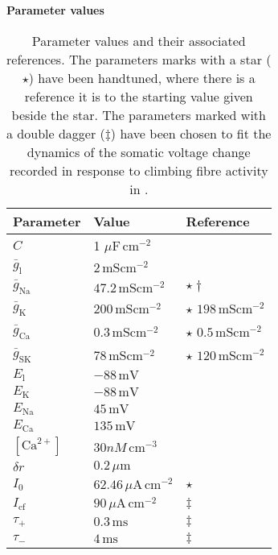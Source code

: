 \documentclass[utf8]{frontiersSCNS} %
\newcommand{\mv}{\,\mathrm{mV}}
\newcommand{\msi}{\,\mathrm{mS cm^{-2}}}
\newcommand{\mse}{\,\mathrm{ms}}
\newcommand{\cm}{\,\mathrm{cm}}
\renewcommand{\k}{\mathrm{K}}
\newcommand{\ca}{\mathrm{Ca}}
\newcommand{\na}{\mathrm{Na}}
\newcommand{\sk}{\mathrm{SK}}
\newcommand{\leak}{\mathrm{l}}
\begin{document}
\begin{table}[!ht]
\centering
\textbf{Parameter values}
\begin{center}
\begin{tabular}{|l l l|}
\hline
Parameter & Value & Reference \\ \hline
$C$&1 $\mu\mathrm{F}\,\mathrm{cm}^{-2}$& \cite{RothHausser2001}\\ \hline
$\bar{g}_\leak$&$2\msi$& \cite{RappEtAl1994}\\ \hline
$\bar{g}_\na$&$47.2\msi$&  $\star\dagger$\\ \hline
$\bar{g}_\k$ &$200\msi$& $\star$ $198\msi$ \cite{AkemannKnopfel2006}\\ \hline
$\bar{g}_\ca$&$0.3\msi$& $\star$ $0.5\msi$ \cite{MiyashoEtAl2001} \\ \hline
$\bar{g}_\sk$&$78\msi$& $\star$ $120\msi$ \cite{RubinCleland2006}\\ \hline
$E_\leak$&$-88\mv$& \cite{MasoliEtAl2015}\\ \hline
$E_\k$&$-88\mv$& \cite{MasoliEtAl2015}\\ \hline
$E_\na$&$45\mv$& \cite{DeSchutterBower1994a}\\ \hline
$E_\ca$&$135\mv$& \cite{DeSchutterBower1994a}\\ \hline
$[\ca^{2+}]$&$30 nM\cm^{-3}$& \cite{KanoEtAl1995}\\ \hline
$\delta r$&$0.2\,\mu\mathrm{m}$& \\ \hline
$I_0$&$62.46\,\mu\mathrm{A}\cm^{-2}$& $\star$\\ \hline
$I_{\mathrm{cf}}$&$90\,\mu\mathrm{A}\cm^{-2}$& $\ddagger$\cite{StuartHausser1994}\\ \hline
$\tau_+$&$0.3\mse$&  $\ddagger$\cite{StuartHausser1994}\\ \hline
$\tau_-$&$4\mse$& $\ddagger$\cite{StuartHausser1994}\\ \hline
\end{tabular}
\end{center}
\caption{Parameter values and their associated references. The
  parameters marks with a star ($\star$) have been handtuned, where
  there is a reference it is to the starting value given beside the
  star. The parameters marked with a double dagger ($\ddagger$) have
  been chosen to fit the dynamics of the somatic voltage change
  recorded in response to climbing fibre activity in
  \protect\cite{DavieEtAl2008}.}
\label{table1}
\end{table}
\end{document}
